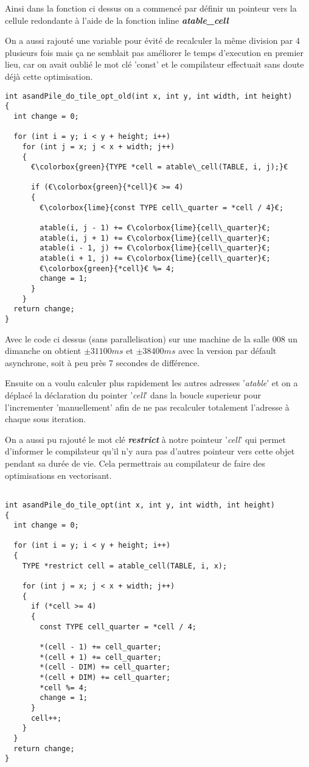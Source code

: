 \documentclass{article}
\begin{document}
Ainsi dans la fonction ci dessus on a commencé par définir un pointeur vers la cellule redondante à l'aide de la fonction inline \textbf{\textit{atable\_cell}}
\par On a aussi rajouté une variable pour évité de recalculer la même division par 4 plusieurs fois mais ça ne semblait pas améliorer le temps d'execution en premier lieu, car on avait oublié le mot clé 'const' et le compilateur effectuait sans doute déjà cette optimisation.

\begin{verbatim}
int asandPile_do_tile_opt_old(int x, int y, int width, int height)
{
  int change = 0;

  for (int i = y; i < y + height; i++)
    for (int j = x; j < x + width; j++)
    {
      €\colorbox{green}{TYPE *cell = atable\_cell(TABLE, i, j);}€

      if (€\colorbox{green}{*cell}€ >= 4)
      {
        €\colorbox{lime}{const TYPE cell\_quarter = *cell / 4}€;

        atable(i, j - 1) += €\colorbox{lime}{cell\_quarter}€;
        atable(i, j + 1) += €\colorbox{lime}{cell\_quarter}€;
        atable(i - 1, j) += €\colorbox{lime}{cell\_quarter}€;
        atable(i + 1, j) += €\colorbox{lime}{cell\_quarter}€;
        €\colorbox{green}{*cell}€ %= 4;
        change = 1;
      }
    }
  return change;
}
\end{verbatim}

Avec le code ci dessus (sans parallelisation) sur une machine de la salle 008 un dimanche on obtient $\pm 31100 ms$ et $\pm 38400 ms$ avec la version par défault asynchrone, soit à peu près 7 secondes de différence.

\par Ensuite on a voulu calculer plus rapidement les autres adresses '\textit{atable}' et on a déplacé la déclaration du pointer '\textit{cell}' dans la boucle superieur pour l'incrementer 'manuellement' afin de ne pas recalculer totalement l'adresse à chaque sous iteration.
\par On a aussi pu rajouté le mot clé \textit{\textbf{restrict}} à notre pointeur '\textit{cell}' qui permet d'informer le compilateur qu'il n'y aura pas d'autres pointeur vers cette objet pendant sa durée de vie. Cela permettrais au compilateur de faire des optimisations en vectorisant.

\begin{verbatim}

int asandPile_do_tile_opt(int x, int y, int width, int height)
{
  int change = 0;

  for (int i = y; i < y + height; i++)
  {
    TYPE *restrict cell = atable_cell(TABLE, i, x);

    for (int j = x; j < x + width; j++)
    {
      if (*cell >= 4)
      {
        const TYPE cell_quarter = *cell / 4;

        *(cell - 1) += cell_quarter;
        *(cell + 1) += cell_quarter;
        *(cell - DIM) += cell_quarter;
        *(cell + DIM) += cell_quarter;
        *cell %= 4;
        change = 1;
      }
      cell++;
    }
  }
  return change;
}
\end{verbatim}
\end{document}
